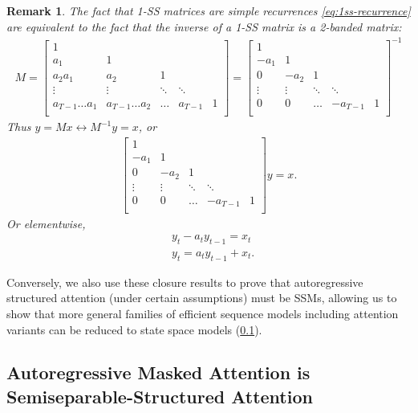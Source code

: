\documentclass{article}
\newtheorem{remark}{Remark}
\begin{document}
\begin{remark}
  The fact that 1-SS matrices are simple recurrences \eqref{eq:1ss-recurrence} are equivalent to the fact that the inverse of a 1-SS matrix is a 2-banded matrix:
\begin{align*}
  M =
  \begin{bmatrix}
    1 & \\
    a_1 & 1 & \\
    a_2a_1 & a_2 & 1 \\
    \vdots & \vdots & \ddots & \ddots \\
    a_{T-1}\dots a_1 & a_{T-1}\dots a_2 & \dots & a_{T-1} & 1 \\
  \end{bmatrix}
  =
  \begin{bmatrix}
    1 & \\
    -a_1 & 1 & \\
    0 & -a_2 & 1 \\
    \vdots & \vdots & \ddots & \ddots \\
    0 & 0 & \dots & -a_{T-1} & 1 \\
  \end{bmatrix}^{-1}
\end{align*}
Thus $y = Mx \leftrightarrow M^{-1}y = x$, or
\begin{align*}
  \begin{bmatrix}
    1 & \\
    -a_1 & 1 & \\
    0 & -a_2 & 1 \\
    \vdots & \vdots & \ddots & \ddots \\
    0 & 0 & \dots & -a_{T-1} & 1 \\
  \end{bmatrix}
  y = x
  .
\end{align*}
Or elementwise,
\begin{align*}
  & y_t - a_t y_{t-1} = x_t \\
  & y_t = a_t y_{t-1} + x_t
  .
\end{align*}
\end{remark}
Conversely,
we also use these closure results to prove that autoregressive structured attention (under certain assumptions)
must be SSMs,
allowing us to show that more general families of efficient sequence models including attention variants can be reduced to state space models (\cref{sec:theory-details:ssm-sma}).

\subsection{Autoregressive Masked Attention is Semiseparable-Structured Attention}
\label{sec:theory-details:ssm-sma}
\end{document}
